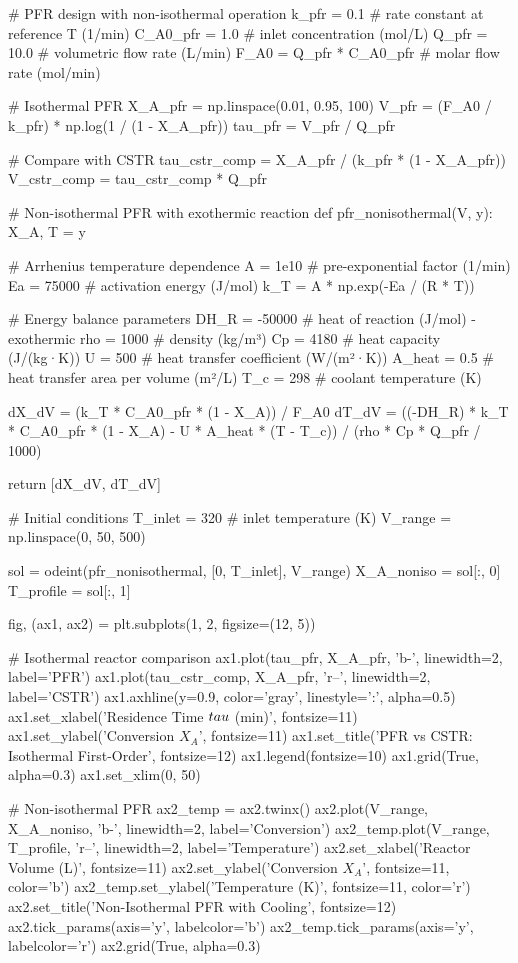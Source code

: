 \documentclass[11pt,a4paper]{article}
\begin{document}
\begin{pycode}
# PFR design with non-isothermal operation
k_pfr = 0.1  # rate constant at reference T (1/min)
C_A0_pfr = 1.0  # inlet concentration (mol/L)
Q_pfr = 10.0  # volumetric flow rate (L/min)
F_A0 = Q_pfr * C_A0_pfr  # molar flow rate (mol/min)

# Isothermal PFR
X_A_pfr = np.linspace(0.01, 0.95, 100)
V_pfr = (F_A0 / k_pfr) * np.log(1 / (1 - X_A_pfr))
tau_pfr = V_pfr / Q_pfr

# Compare with CSTR
tau_cstr_comp = X_A_pfr / (k_pfr * (1 - X_A_pfr))
V_cstr_comp = tau_cstr_comp * Q_pfr

# Non-isothermal PFR with exothermic reaction
def pfr_nonisothermal(V, y):
    X_A, T = y

    # Arrhenius temperature dependence
    A = 1e10  # pre-exponential factor (1/min)
    Ea = 75000  # activation energy (J/mol)
    k_T = A * np.exp(-Ea / (R * T))

    # Energy balance parameters
    DH_R = -50000  # heat of reaction (J/mol) - exothermic
    rho = 1000  # density (kg/m³)
    Cp = 4180  # heat capacity (J/(kg·K))
    U = 500  # heat transfer coefficient (W/(m²·K))
    A_heat = 0.5  # heat transfer area per volume (m²/L)
    T_c = 298  # coolant temperature (K)

    dX_dV = (k_T * C_A0_pfr * (1 - X_A)) / F_A0
    dT_dV = ((-DH_R) * k_T * C_A0_pfr * (1 - X_A) - U * A_heat * (T - T_c)) / (rho * Cp * Q_pfr / 1000)

    return [dX_dV, dT_dV]

# Initial conditions
T_inlet = 320  # inlet temperature (K)
V_range = np.linspace(0, 50, 500)

sol = odeint(pfr_nonisothermal, [0, T_inlet], V_range)
X_A_noniso = sol[:, 0]
T_profile = sol[:, 1]

fig, (ax1, ax2) = plt.subplots(1, 2, figsize=(12, 5))

# Isothermal reactor comparison
ax1.plot(tau_pfr, X_A_pfr, 'b-', linewidth=2, label='PFR')
ax1.plot(tau_cstr_comp, X_A_pfr, 'r--', linewidth=2, label='CSTR')
ax1.axhline(y=0.9, color='gray', linestyle=':', alpha=0.5)
ax1.set_xlabel('Residence Time $\\tau$ (min)', fontsize=11)
ax1.set_ylabel('Conversion $X_A$', fontsize=11)
ax1.set_title('PFR vs CSTR: Isothermal First-Order', fontsize=12)
ax1.legend(fontsize=10)
ax1.grid(True, alpha=0.3)
ax1.set_xlim(0, 50)

# Non-isothermal PFR
ax2_temp = ax2.twinx()
ax2.plot(V_range, X_A_noniso, 'b-', linewidth=2, label='Conversion')
ax2_temp.plot(V_range, T_profile, 'r--', linewidth=2, label='Temperature')
ax2.set_xlabel('Reactor Volume (L)', fontsize=11)
ax2.set_ylabel('Conversion $X_A$', fontsize=11, color='b')
ax2_temp.set_ylabel('Temperature (K)', fontsize=11, color='r')
ax2.set_title('Non-Isothermal PFR with Cooling', fontsize=12)
ax2.tick_params(axis='y', labelcolor='b')
ax2_temp.tick_params(axis='y', labelcolor='r')
ax2.grid(True, alpha=0.3)


\end{pycode}
\end{document}
